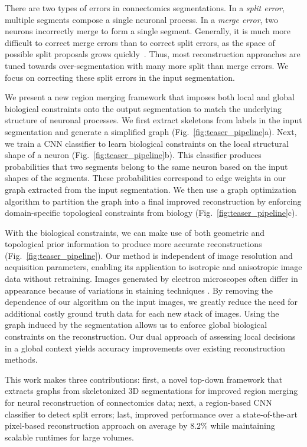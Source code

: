 There are two types of errors in connectomics segmentations.
In a \textit{split error}, multiple segments compose a single neuronal process. 
In a \textit{merge error}, two neurons incorrectly merge to form a single segment. 
Generally, it is much more difficult to correct merge errors than to correct split errors, as the space of possible split proposals grows quickly~\cite{parag2015properties}.
Thus, most reconstruction approaches are tuned towards over-segmentation with many more split than merge errors.
We focus on correcting these split errors in the input segmentation.

We present a new region merging framework that imposes both local and global biological constraints onto the output segmentation to match the underlying structure of neuronal processes.
We first extract skeletons from labels in the input segmentation and generate a simplified graph (Fig.~\ref{fig:teaser_pipeline}a). 
Next, we train a CNN classifier to learn biological constraints on the local structural shape of a neuron (Fig.~\ref{fig:teaser_pipeline}b).
This classifier produces probabilities that two segments belong to the same neuron based on the input shapes of the segments.
These probabilities correspond to edge weights in our graph extracted from the input segmentation.
We then use a graph optimization algorithm to partition the graph into a final improved reconstruction by enforcing domain-specific topological constraints from biology (Fig.~\ref{fig:teaser_pipeline}c).

With the biological constraints, we can make use of both geometric and topological prior information to produce more accurate reconstructions (Fig.~\ref{fig:teaser_pipeline}).
Our method is independent of image resolution and acquisition parameters, enabling its application to isotropic and anisotropic image data without retraining.
Images generated by electron microscopes often differ in appearance because of variations in staining techniques \cite{briggman2012volume}.
By removing the dependence of our algorithm on the input images, we greatly reduce the need for additional costly ground truth data for each new stack of images.
Using the graph induced by the segmentation allows us to enforce global biological constraints on the reconstruction. 
Our dual approach of assessing local decisions in a global context yields accuracy improvements over existing reconstruction methods.


This work makes three contributions:
first, a novel top-down framework that extracts graphs from skeletonized 3D segmentations for improved region merging for neural reconstruction of connectomics data; 
next, a region-based CNN classifier to detect split errors; 
last, improved performance over a state-of-the-art pixel-based reconstruction approach on average by $8.2\%$ while maintaining scalable runtimes for large volumes.
